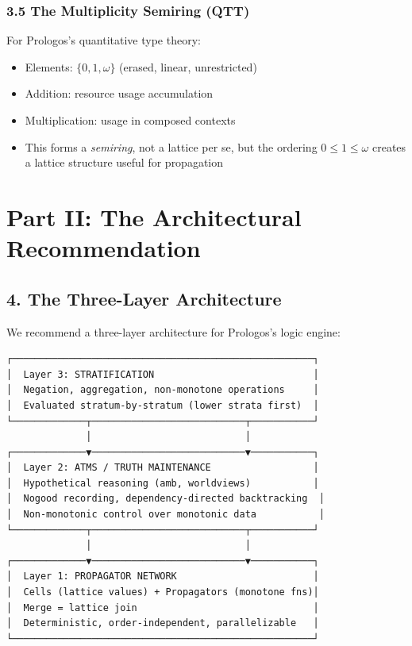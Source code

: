 \documentclass[11pt]{article}
\begin{document}
\subsubsection{3.5 The Multiplicity Semiring (QTT)}
\label{sec:org90250d6}

For Prologos's quantitative type theory:

\begin{itemize}
\item Elements: \(\{0, 1, \omega\}\) (erased, linear, unrestricted)
\item Addition: resource usage accumulation
\item Multiplication: usage in composed contexts
\item This forms a \emph{semiring}, not a lattice per se, but the ordering \(0 \leq 1 \leq \omega\)
creates a lattice structure useful for propagation
\end{itemize}
\section{Part II: The Architectural Recommendation}
\label{sec:orgd5aa6b5}

\subsection{4. The Three-Layer Architecture}
\label{sec:orgbb9fa46}

We recommend a three-layer architecture for Prologos's logic engine:

\begin{verbatim}
┌─────────────────────────────────────────────────────┐
│  Layer 3: STRATIFICATION                            │
│  Negation, aggregation, non-monotone operations     │
│  Evaluated stratum-by-stratum (lower strata first)  │
└─────────────┬───────────────────────────┬───────────┘
              │                           │
┌─────────────▼───────────────────────────▼───────────┐
│  Layer 2: ATMS / TRUTH MAINTENANCE                  │
│  Hypothetical reasoning (amb, worldviews)           │
│  Nogood recording, dependency-directed backtracking  │
│  Non-monotonic control over monotonic data           │
└─────────────┬───────────────────────────┬───────────┘
              │                           │
┌─────────────▼───────────────────────────▼───────────┐
│  Layer 1: PROPAGATOR NETWORK                        │
│  Cells (lattice values) + Propagators (monotone fns)│
│  Merge = lattice join                               │
│  Deterministic, order-independent, parallelizable   │
└─────────────────────────────────────────────────────┘
\end{verbatim}
\end{document}
